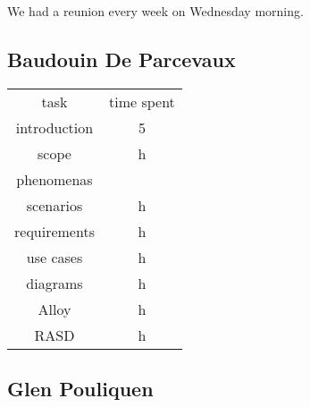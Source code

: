 We had a reunion every week on Wednesday morning. 
\subsection{Baudouin De Parcevaux}
\begin{tabular}{| c | c | }
	task & time spent \\
	introduction & 5 \\
 	scope & h\\
 	phenomenas & \\
	scenarios & h\\
 	requirements & h\\
	use cases & h\\
	diagrams & h\\
	Alloy & h\\
	RASD & h\\
\end{tabular}

\subsection{Glen Pouliquen}
